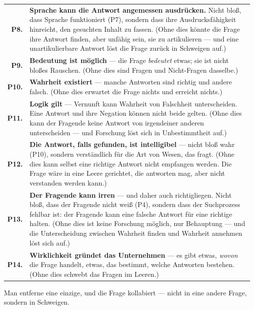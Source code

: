 \documentclass[10pt, openany, oneside]{book}
\renewcommand{\footnotesize}{\fontsize{8.5}{11}\selectfont}
\begin{document}
{\footnotesize
\noindent\begin{tabular}{r p{}}
\textbf{P8.} & \textbf{Sprache kann die Antwort angemessen ausdrücken.} Nicht bloß, dass Sprache funktioniert (P7), sondern dass ihre Ausdrucksfähigkeit hinreicht, den gesuchten Inhalt zu fassen. (Ohne dies könnte die Frage ihre Antwort finden, aber unfähig sein, sie zu artikulieren --- und eine unartikulierbare Antwort löst die Frage zurück in Schweigen auf.) \\[0.3em]
\textbf{P9.} & \textbf{Bedeutung ist möglich} --- die Frage \textit{bedeutet} etwas; sie ist nicht bloßes Rauschen. (Ohne dies sind Fragen und Nicht-Fragen dasselbe.) \\[0.3em]
\textbf{P10.} & \textbf{Wahrheit existiert} --- manche Antworten sind richtig und andere falsch. (Ohne dies erwartet die Frage nichts und erreicht nichts.) \\[0.3em]
\textbf{P11.} & \textbf{Logik gilt} --- Vernunft kann Wahrheit von Falschheit unterscheiden. Eine Antwort und ihre Negation können nicht beide gelten. (Ohne dies kann der Fragende keine Antwort von irgendeiner anderen unterscheiden --- und Forschung löst sich in Unbestimmtheit auf.) \\[0.3em]
\textbf{P12.} & \textbf{Die Antwort, falls gefunden, ist intelligibel} --- nicht bloß wahr (P10), sondern verständlich für die Art von Wesen, das fragt. (Ohne dies kann selbst eine richtige Antwort nicht empfangen werden. Die Frage wäre in eine Leere gerichtet, die antworten mag, aber nicht verstanden werden kann.) \\[0.3em]
\textbf{P13.} & \textbf{Der Fragende kann irren} --- und daher auch richtigliegen. Nicht bloß, dass der Fragende nicht weiß (P4), sondern dass der Suchprozess fehlbar ist: der Fragende kann eine falsche Antwort für eine richtige halten. (Ohne dies ist keine Forschung möglich, nur Behauptung --- und die Unterscheidung zwischen Wahrheit finden und Wahrheit annehmen löst sich auf.) \\[0.3em]
\textbf{P14.} & \textbf{Wirklichkeit gründet das Unternehmen} --- es gibt etwas, \textit{wovon} die Frage handelt, etwas, das bestimmt, welche Antworten bestehen. (Ohne dies schwebt das Fragen im Leeren.) \\[0.3em]
\end{tabular}
}

\vspace{0.8em}

\noindent Man entferne eine einzige, und die Frage kollabiert --- nicht in eine andere Frage, sondern in Schweigen.
\end{document}
